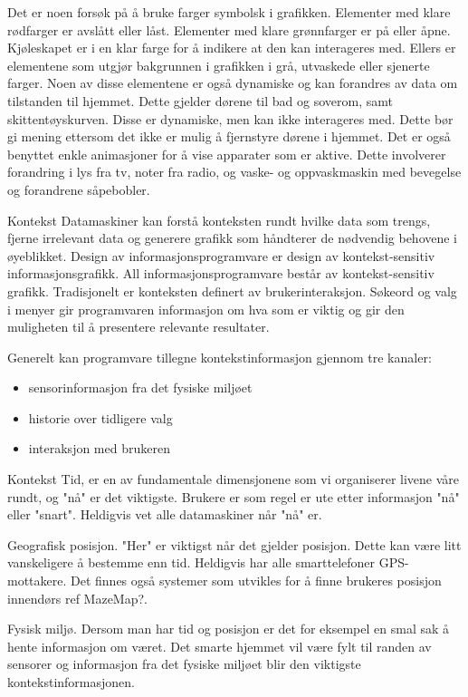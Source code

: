 Det er noen forsøk på å bruke farger symbolsk i grafikken. Elementer med klare rødfarger er avslått eller låst. Elementer med klare grønnfarger er på eller åpne. Kjøleskapet er i en klar farge for å indikere at den kan interageres med. Ellers er elementene som utgjør bakgrunnen i grafikken i grå, utvaskede eller sjenerte farger. Noen av disse elementene er også dynamiske og kan forandres av data om tilstanden til hjemmet. Dette gjelder dørene til bad og soverom, samt skittentøyskurven. Disse er dynamiske, men kan ikke interageres med. Dette bør gi mening ettersom det ikke er mulig å fjernstyre dørene i hjemmet. Det er også benyttet enkle animasjoner for å vise apparater som er aktive. Dette involverer forandring i lys fra tv, noter fra radio, og vaske- og oppvaskmaskin med bevegelse og forandrene såpebobler.


Kontekst
Datamaskiner kan forstå konteksten rundt hvilke data som trengs, fjerne irrelevant data og generere grafikk som håndterer de nødvendig behovene i øyeblikket. Design av informasjonsprogramvare er design av kontekst-sensitiv informasjonsgrafikk. All informasjonsprogramvare består av kontekst-sensitiv grafikk. Tradisjonelt er konteksten definert av brukerinteraksjon. Søkeord og valg i menyer gir programvaren informasjon om hva som er viktig og gir den muligheten til å presentere relevante resultater.

Generelt kan programvare tillegne kontekstinformasjon gjennom tre kanaler:
\begin{itemize}
\item sensorinformasjon fra det fysiske miljøet
\item historie over tidligere valg
\item interaksjon med brukeren
\end{itemize}

Kontekst
Tid, er en av fundamentale dimensjonene som vi organiserer livene våre rundt, og "nå" er det viktigste. Brukere er som regel er ute etter informasjon "nå" eller "snart". Heldigvis vet alle datamaskiner når "nå" er.

Geografisk posisjon. "Her" er viktigst når det gjelder posisjon. Dette kan være litt vanskeligere å bestemme enn tid. Heldigvis har alle smarttelefoner GPS-mottakere. Det finnes også systemer som utvikles for å finne brukeres posisjon innendørs {\color{red}ref MazeMap?}.

Fysisk miljø. Dersom man har tid og posisjon er det for eksempel en smal sak å hente informasjon om været. Det smarte hjemmet vil være fylt til randen av sensorer og informasjon fra det fysiske miljøet blir den viktigste kontekstinformasjonen.

